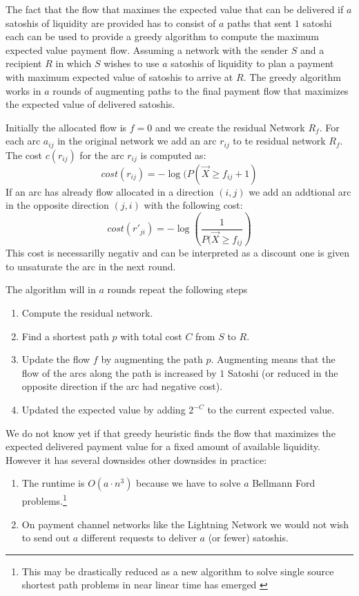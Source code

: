\documentclass[10pt,twocolumn]{article}
\begin{document}
The fact that the flow that maximes the expected value that can be delivered if $a$ satoshis of liquidity are provided has to consist of $a$ paths that sent $1$ satoshi each can be used to provide a greedy algorithm to compute the maximum expected value payment flow.
Assuming a network with the sender $S$ and a recipient $R$ in which $S$ wishes to use $a$ satoshis of liquidity to plan a payment with maximum expected value of satoshis to arrive at $R$.
The greedy algorithm works in $a$ rounds of augmenting paths to the final payment flow that maximizes the expected value of delivered satoshis.

Initially the allocated flow is $f=0$ and we create the residual Network $R_f$.
For each arc $a_{ij}$ in the original network we add an arc $r_{ij}$ to te residual network $R_f$.
The cost $c(r_{ij})$ for the arc $r_{ij}$ is computed as:
\[
cost(r_{ij})=-\log(P(\vec{X} \geq f_{ij} + 1)
\]
If an arc has already flow allocated in a direction $(i,j)$ we add an addtional arc in the opposite direction $(j,i)$ with the following cost:
\[
cost(r'_{ji}) = -\log\left(\frac{1}{P(\vec{X}\geq f_{ij}}\right)
\]
This cost is necessarilly negativ and can be interpreted as a discount one is given to unsaturate the arc in the next round.

The algorithm will in $a$ rounds repeat the following steps
\begin{enumerate}
\item Compute the residual network.
\item Find a shortest path $p$ with total cost $C$ from $S$ to $R$.
\item Update the flow $f$ by augmenting the path $p$. Augmenting means that the flow of the arcs along the path is increased by $1$ Satoshi (or reduced in the opposite direction if the arc had negative cost).
\item Updated the expected value by adding $2^{-C}$ to the current expected value.
\end{enumerate}

We do not know yet if that greedy heuristic finds the flow that maximizes the expected delivered payment value for a fixed amount of available liquidity.
However it has several downsides other downsides in practice:
\begin{enumerate}
\item The runtime is $O(a\cdot n^3)$ because we have to solve $a$ Bellmann Ford problems.\footnote{This may be drastically reduced as a new algorithm to solve single source shortest path problems in near linear time has emerged \cite{bernstein2022negative}}
\item On payment channel networks like the Lightning Network we would not wish to send out $a$ different requests to deliver $a$ (or fewer) satoshis.
\end{enumerate}
\end{document}

